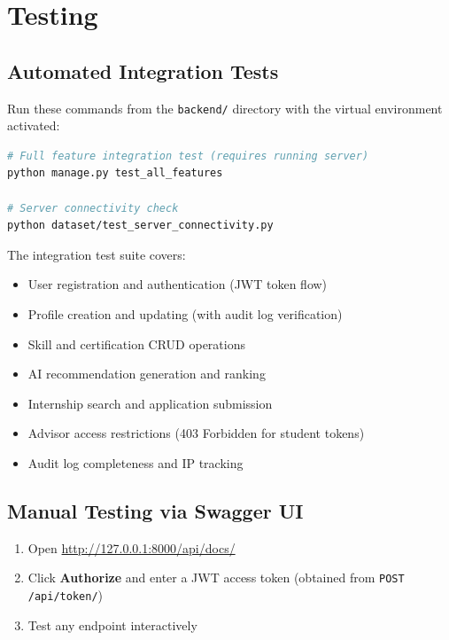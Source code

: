 \documentclass[12pt, a4paper]{article}
\begin{document}
\newpage

\section{Testing}

\subsection{Automated Integration Tests}

Run these commands from the \texttt{backend/} directory with the virtual environment activated:

\begin{lstlisting}[language=bash]
# Full feature integration test (requires running server)
python manage.py test_all_features

# Server connectivity check
python dataset/test_server_connectivity.py
\end{lstlisting}

The integration test suite covers:
\begin{itemize}
    \item User registration and authentication (JWT token flow)
    \item Profile creation and updating (with audit log verification)
    \item Skill and certification CRUD operations
    \item AI recommendation generation and ranking
    \item Internship search and application submission
    \item Advisor access restrictions (403 Forbidden for student tokens)
    \item Audit log completeness and IP tracking
\end{itemize}

\subsection{Manual Testing via Swagger UI}

\begin{enumerate}
    \item Open \url{http://127.0.0.1:8000/api/docs/}
    \item Click \textbf{Authorize} and enter a JWT access token (obtained from \texttt{POST /api/token/})
    \item Test any endpoint interactively
\end{enumerate}
\end{document}
